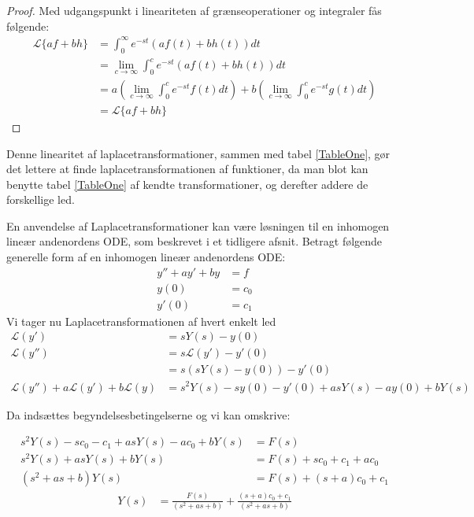 \begin{proof}
Med udgangspunkt i lineariteten af grænseoperationer og integraler fås følgende:
\begin{align*}
    \mathcal{L}\{af + bh\} &= \int_0^\infty{e^{-st}(af(t) + bh(t))} dt\\
    &= \lim_{c\to\infty} \int_0^c{e^{-st}(af(t) + bh(t))} dt\\
    &= a \left( \lim_{c\to\infty} \int_0^c{e^{-st}f(t)} dt \right) + b \left(\lim_{c\to\infty} \int_0^c{e^{-st}g(t)} dt \right)\\
    &= \mathcal{L}\{af + bh\}
\end{align*}

\end{proof}

Denne linearitet af laplacetransformationer, sammen med tabel \ref{TableOne}, gør det lettere at finde laplacetransformationen af funktioner, da man blot kan benytte tabel \ref{TableOne} af kendte transformationer, og derefter addere de forskellige led.
\hfill \break

En anvendelse af Laplacetransformationer kan være løsningen til en inhomogen lineær andenordens ODE, som beskrevet i et tidligere afsnit. Betragt følgende generelle form af en inhomogen lineær andenordens ODE: 
\begin{align*}
    y'' + ay' + by &= f\\
    y(0) &= c_0\\
    y'(0) &= c_1
\end{align*}
Vi tager nu Laplacetransformationen af hvert enkelt led
\begin{align*}
    \mathcal{L}(y') &= sY(s) - y(0)\\
    \mathcal{L}(y'') &= s\mathcal{L}(y') - y'(0)\\
    &=s(sY(s) - y(0))- y'(0)\\
    \mathcal{L}(y'') + a\mathcal{L}(y') + b \mathcal{L}(y) &=s^2Y(s) - sy(0) - y'(0) + asY(s) - ay(0) + bY(s)
\end{align*}

Da indsættes begyndelsesbetingelserne og vi kan omskrive:

\begin{align*}
    s^2 Y(s) - sc_0 - c_1 + asY(s) - ac_0 + bY(s) &= F(s)\\
    s^2 Y(s) + asY(s) + bY(s) &= F(s) + sc_0 + c_1 + ac_0\\
    (s^2 + as + b)Y(s) &= F(s) + (s + a)c_0 + c_1
\end{align*}
\begin{align}\label{UbeKoefLap}
        Y(s) &= \frac{F(s)}{(s^2 + as + b)} + \frac{(s+a)c_0 + c_1}{(s^2 + as + b)}
\end{align}

